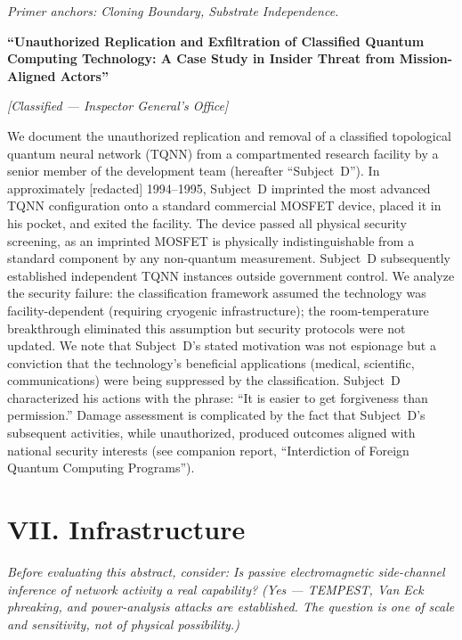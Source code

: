 \noindent\textit{Primer anchors: Cloning Boundary, Substrate Independence.}

\textbf{``Unauthorized Replication and Exfiltration of Classified Quantum Computing Technology: A Case Study in Insider Threat from Mission-Aligned Actors''}

\textit{[Classified --- Inspector General's Office]}

\vspace{0.3cm}

We document the unauthorized replication and removal of a classified topological quantum neural network (TQNN) from a compartmented research facility by a senior member of the development team (hereafter ``Subject~D''). In approximately [redacted] 1994--1995, Subject~D imprinted the most advanced TQNN configuration onto a standard commercial MOSFET device, placed it in his pocket, and exited the facility. The device passed all physical security screening, as an imprinted MOSFET is physically indistinguishable from a standard component by any non-quantum measurement. Subject~D subsequently established independent TQNN instances outside government control. We analyze the security failure: the classification framework assumed the technology was facility-dependent (requiring cryogenic infrastructure); the room-temperature breakthrough eliminated this assumption but security protocols were not updated. We note that Subject~D's stated motivation was not espionage but a conviction that the technology's beneficial applications (medical, scientific, communications) were being suppressed by the classification.
Subject~D characterized his actions with the phrase: ``It is easier to get forgiveness than permission.'' Damage assessment is complicated by the fact that Subject~D's subsequent activities, while unauthorized, produced outcomes aligned with national security interests (see companion report, ``Interdiction of Foreign Quantum Computing Programs'').

\vspace{1cm}

\section*{VII. Infrastructure}
\label{appendix:infrastructure}

\noindent\textit{Before evaluating this abstract, consider: Is passive electromagnetic side-channel inference of network activity a real capability? (Yes --- TEMPEST, Van Eck phreaking, and power-analysis attacks are established. The question is one of scale and sensitivity, not of physical possibility.)}

